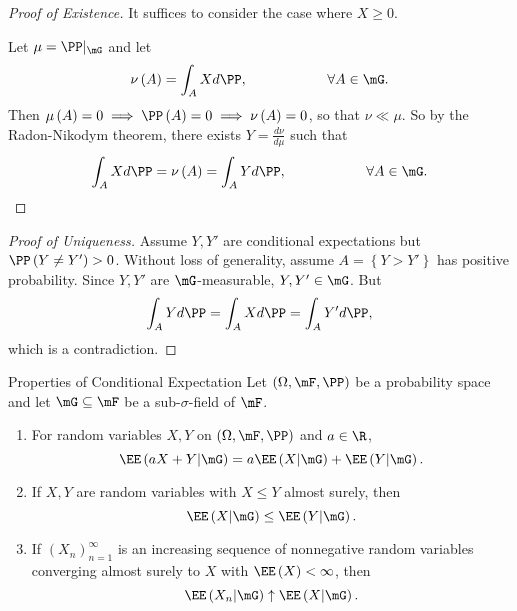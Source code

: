 \documentclass[stat901]{subfiles}
\begin{document}
    \begin{proof}[Proof of Existence]\qedplacedtrue
        It suffices to consider the case where $X\geq 0$.

        Let $\mu=\PP|_{\mG}$ and let
        \begin{equation*}
            \nu\left( A \right) = \int_AXd\PP, \hspace{2cm}\forall A\in\mG.
        \end{equation*}
        Then $\mu\left( A \right) = 0 \implies \PP\left( A \right) = 0 \implies \nu\left( A \right) = 0$, so that $\nu\ll\mu$. So by the Radon-Nikodym theorem, there exists $Y = \frac{d\nu}{d\mu}$ such that
        \begin{equation*}
            \int_AXd\PP = \nu\left( A \right) = \int_AYd\PP, \hspace{2cm}\forall A\in\mG.
        \end{equation*}
    \end{proof}
    
    \begin{proof}[Proof of Uniqueness]
        Assume $Y,Y'$ are conditional expectations but $\PP\left( Y\neq Y' \right)>0$. Without loss of generality, assume $A = \left\lbrace Y>Y' \right\rbrace$ has positive probability. Since $Y,Y'$ are $\mG$-measurable, $Y,Y'\in\mG$. But
        \begin{equation*}
            \int_AYd\PP = \int_AXd\PP = \int_AY'd\PP,
        \end{equation*}
        which is a contradiction.
    \end{proof}
    
    \begin{prop}{Properties of Conditional Expectation}
        Let $\left( \Omega,\mF,\PP \right)$ be a probability space and let $\mG\subseteq\mF$ be a sub-$\sigma$-field of $\mF$.
        \begin{enumerate}
            \item For random variables $X,Y$ on $\left( \Omega,\mF,\PP \right)$ and $a\in\R$,
                \begin{equation*}
                    \EE\left( aX+Y|\mG \right) = a\EE\left( X|\mG \right) + \EE\left( Y|\mG \right).
                \end{equation*}
            \item If $X,Y$ are random variables with $X\leq Y$ almost surely, then
                \begin{equation*}
                    \EE\left( X|\mG \right) \leq \EE\left( Y|\mG \right).
                \end{equation*}

            \item If $\left( X_{n} \right)^{\infty}_{n=1}$ is an increasing sequence of nonnegative random variables converging almost surely to $X$ with $\EE\left( X \right)<\infty$, then
                \begin{equation*}
                    \EE\left( X_n|\mG \right) \uparrow \EE\left( X|\mG \right).
                \end{equation*}
        \end{enumerate}
    \end{prop}
\end{document}
